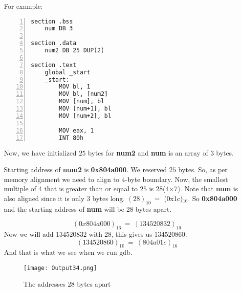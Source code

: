 \documentclass{article}
\begin{document}
\vspace{10pt}
For example:
\begin{Verbatim}[numbers=left, frame=single]
section .bss
	num DB 3
	
section .data
	num2 DB 25 DUP(2)

section .text
	global _start
	_start:
		MOV bl, 1
		MOV bl, [num2]
		MOV [num], bl
		MOV [num+1], bl
		MOV [num+2], bl
		
		MOV eax, 1
		INT 80h
\end{Verbatim}
Now, we have initialized $25$ bytes for \textbf{num2} and \textbf{num} is an array of $3$ bytes.

Starting address of \textbf{num2} is \textbf{0x804a000}. We reserved $25$ bytes. So, as per memory alignment we need to align to $4$-byte boundary. Now, the smallest multiple of $4$ that is greater than or equal to $25$ is $28$(4$\times$7). Note that \textbf{num} is also aligned since it is only $3$ bytes long. $(28)_{10}\ =$ (0x1c)$_{16}$. So \textbf{0x804a000} and the starting address of \textbf{num} will be $28$ bytes apart.

$$
(0x804a000)_{16}\ =\ (134520832)_{10}
$$
\newpage
Now we will add $134520832$ with $28$, this gives us $134520860$.
$$
(134520860)_{10}\ =\ (804a01c)_{16}
$$
And that is what we see when we run gdb.
\begin{figure}[h]
	\centering
	\texttt{[image: Output34.png]}
	\caption{The addresses $28$ bytes apart}
	\label{fig:fig4}
\end{figure}
\end{document}
